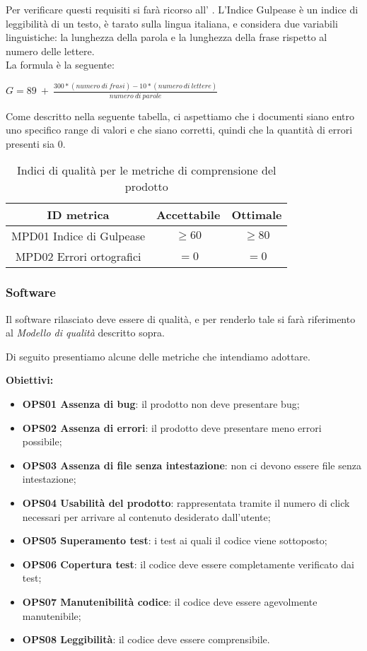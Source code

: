 \documentclass[../piano_di_qualifica.tex]{subfiles}
\begin{document}
Per verificare questi requisiti si farà ricorso all’ . L'Indice Gulpease è un indice di leggibilità di un testo, è tarato sulla lingua italiana, e considera due variabili linguistiche: la lunghezza della parola e la lunghezza della frase rispetto al numero delle lettere.\\
La formula è la seguente:\par
\begin{center}
	$G = 89\ +\ \frac{300 * (numero\ di\ frasi) - 10 * (numero\ di\ lettere)}{numero\ di\ parole} $
\end{center}
Come descritto nella seguente tabella, ci aspettiamo che i documenti siano entro uno specifico range di valori e che siano corretti, quindi che la quantità di errori presenti sia 0. \par

\begin{table}[!ht]
	\centering
	\begin{tabular}{|c|c|c|}
		\hline
		\rowcolor{lightgray}
		\textbf{ID metrica}      & \textbf{Accettabile} & \textbf{ Ottimale} \\
		\hline
		MPD01 Indice di Gulpease & \(\ge 60\)           & \(\ge 80\)         \\
		MPD02 Errori ortografici & \(= 0\)              & \(= 0\)            \\
		\hline
	\end{tabular}
	\caption{Indici di qualità per le metriche di comprensione del prodotto}
\end{table}


\subsubsection{Software}
Il software rilasciato deve essere di qualità, e per renderlo tale si farà riferimento al \emph{Modello di qualità} descritto sopra.

Di seguito presentiamo alcune delle metriche che intendiamo adottare.

\textbf{Obiettivi:}
\smallbreak
\begin{itemize}
	\item \textbf{OPS01 Assenza di bug}: il prodotto non deve presentare bug;
	\item \textbf{OPS02 Assenza di errori}: il prodotto deve presentare meno errori possibile;
	\item \textbf{OPS03 Assenza di file senza intestazione}: non ci devono essere file senza intestazione;
	\item \textbf{OPS04 Usabilità del prodotto}: rappresentata tramite il numero di click necessari per arrivare al contenuto desiderato dall'utente;
	\item \textbf{OPS05 Superamento test}: i test ai quali il codice viene sottoposto;
	\item \textbf{OPS06 Copertura test}: il codice deve essere completamente verificato dai test;
	\item \textbf{OPS07 Manutenibilità codice}: il codice deve essere agevolmente manutenibile;
	\item \textbf{OPS08 Leggibilità}: il codice deve essere comprensibile.
\end{itemize}
\end{document}
